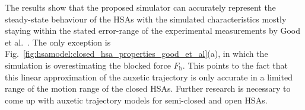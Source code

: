 


The results show that the proposed simulator can accurately represent the steady-state behaviour of the \glspl{HSA} with the simulated characteristics mostly staying within the stated error-range of the experimental measurements by Good et al.~\cite{good2022expanding}. The only exception is Fig.~\ref{fig:hsamodel:closed_hsa_properties_good_et_al}(a), in which the simulation is overestimating the blocked force $F_\mathrm{b}$. This points to the fact that this linear approximation of the auxetic trajectory is only accurate in a limited range of the motion range of the closed \glspl{HSA}. Further research is necessary to come up with auxetic trajectory models for semi-closed and open \glspl{HSA}.

